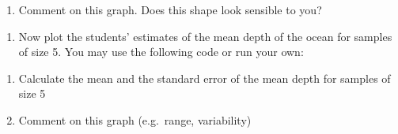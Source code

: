 \documentclass[letterpaper,10pt,twoside,]{pinp}
\providecommand{\tightlist}{%
  \setlength{\itemsep}{0pt}\setlength{\parskip}{0pt}}
\begin{document}
\begin{Shaded}
\begin{Highlighting}[]
\NormalTok{(}\NormalTok{(water_results[,}\NormalTok{]), }
      \NormalTok{(}\NormalTok{,}\NormalTok{),}
      \NormalTok{,}
      \NormalTok{, }
      \NormalTok{(}\OperatorTok{/}\NormalTok{), }
      \NormalTok{)}
\end{Highlighting}
\end{Shaded}

\begin{enumerate}
\def\labelenumi{\alph{enumi})}
\tightlist
\item
  Comment on this graph. Does this shape look sensible to you?
\end{enumerate}

\begin{enumerate}
\def\labelenumi{\arabic{enumi}.}
\setcounter{enumi}{2}
\tightlist
\item
  Now plot the students' estimates of the mean depth of the ocean for
  samples of size 5. You may use the following code or run your own:
\end{enumerate}

\begin{Shaded}
\begin{Highlighting}[]
\StringTok{ }\NormalTok{(}\NormalTok{,}\NormalTok{,}\NormalTok{)}
\NormalTok{(water_results[,}\NormalTok{], }
      \NormalTok{(}\NormalTok{,}\NormalTok{),}
      \NormalTok{(}\OperatorTok{/}\NormalTok{), }
      \NormalTok{,}
      \NormalTok{)}
\end{Highlighting}
\end{Shaded}

\begin{enumerate}
\def\labelenumi{\alph{enumi})}
\tightlist
\item
  Calculate the mean and the standard error of the mean depth for
  samples of size 5
\item
  Comment on this graph (e.g.~range, variability)
\end{enumerate}
\end{document}
